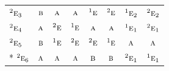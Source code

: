 \documentclass[10pt,a4paper]{article}
\numberwithin{equation}{section}
\newcommand{\irr}[1]{\text{\normalfont\scshape #1}}
\newcommand{\conjpair}[1]{{}^{#1}}
\begin{document}
{\begin{longtable}{@{}lccccccc@{}}
$\conjpair{2}\irr{e}_{3}$ & $\irr{b}$ & $\irr{a}$ & $\irr{a}$ & $\conjpair{1}\irr{e}$ & $\conjpair{2}\irr{e}$ & $\conjpair{1}\irr{e}_{2}$ & $\conjpair{2}\irr{e}_{2}$\\
$\conjpair{2}\irr{e}_{4}$ & $\irr{a}$ & $\conjpair{2}\irr{e}$ & $\conjpair{1}\irr{e}$ & $\irr{a}$ & $\irr{a}$ & $\conjpair{1}\irr{e}_{1}$ & $\conjpair{2}\irr{e}_{1}$\\
$\conjpair{2}\irr{e}_{5}$ & $\irr{b}$ & $\conjpair{1}\irr{e}$ & $\conjpair{2}\irr{e}$ & $\conjpair{2}\irr{e}$ & $\conjpair{1}\irr{e}$ & $\irr{a}$ & $\irr{a}$\\*
$\conjpair{2}\irr{e}_{6}$ & $\irr{a}$ & $\irr{a}$ & $\irr{a}$ & $\irr{b}$ & $\irr{b}$ & $\conjpair{2}\irr{e}_{1}$ & $\conjpair{1}\irr{e}_{1}$\\
\bottomrule\end{longtable}}
\end{document}
